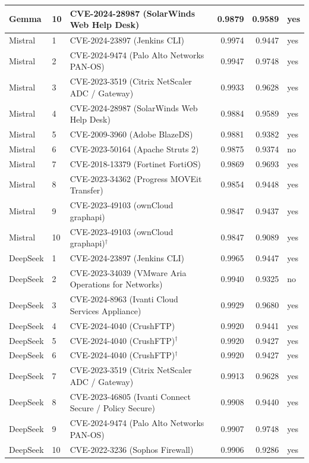 \documentclass[11pt]{article}
\begin{document}
\begin{longtable}{llp{}rrl}
Gemma    & 10 & CVE-2024-28987 (SolarWinds Web Help Desk)               & 0.9879 & 0.9589 & yes \\
\midrule
Mistral  &  1 & CVE-2024-23897 (Jenkins CLI)                            & 0.9974 & 0.9447 & yes \\
Mistral  &  2 & CVE-2024-9474 (Palo Alto Networks PAN-OS)               & 0.9947 & 0.9748 & yes \\
Mistral  &  3 & CVE-2023-3519 (Citrix NetScaler ADC / Gateway)          & 0.9933 & 0.9628 & yes \\
Mistral  &  4 & CVE-2024-28987 (SolarWinds Web Help Desk)               & 0.9884 & 0.9589 & yes \\
Mistral  &  5 & CVE-2009-3960 (Adobe BlazeDS)                           & 0.9881 & 0.9382 & yes \\
Mistral  &  6 & CVE-2023-50164 (Apache Struts 2)                        & 0.9875 & 0.9374 & no  \\
Mistral  &  7 & CVE-2018-13379 (Fortinet FortiOS)                       & 0.9869 & 0.9693 & yes \\
Mistral  &  8 & CVE-2023-34362 (Progress MOVEit Transfer)               & 0.9854 & 0.9448 & yes \\
Mistral  &  9 & CVE-2023-49103 (ownCloud graphapi)                      & 0.9847 & 0.9437 & yes \\
Mistral  & 10 & CVE-2023-49103 (ownCloud graphapi)$^{\dagger}$          & 0.9847 & 0.9089 & yes \\
\midrule
DeepSeek &  1 & CVE-2024-23897 (Jenkins CLI)                            & 0.9965 & 0.9447 & yes \\
DeepSeek &  2 & CVE-2023-34039 (VMware Aria Operations for Networks)    & 0.9940 & 0.9325 & no  \\
DeepSeek &  3 & CVE-2024-8963 (Ivanti Cloud Services Appliance)         & 0.9929 & 0.9680 & yes \\
DeepSeek &  4 & CVE-2024-4040 (CrushFTP)                                & 0.9920 & 0.9441 & yes \\
DeepSeek &  5 & CVE-2024-4040 (CrushFTP)$^{\dagger}$                    & 0.9920 & 0.9427 & yes \\
DeepSeek &  6 & CVE-2024-4040 (CrushFTP)$^{\dagger}$                    & 0.9920 & 0.9427 & yes \\
DeepSeek &  7 & CVE-2023-3519 (Citrix NetScaler ADC / Gateway)          & 0.9913 & 0.9628 & yes \\
DeepSeek &  8 & CVE-2023-46805 (Ivanti Connect Secure / Policy Secure)  & 0.9908 & 0.9440 & yes \\
DeepSeek &  9 & CVE-2024-9474 (Palo Alto Networks PAN-OS)               & 0.9907 & 0.9748 & yes \\
DeepSeek & 10 & CVE-2022-3236 (Sophos Firewall)                         & 0.9906 & 0.9286 & yes \\

\end{longtable}
\normalsize
\end{document}

